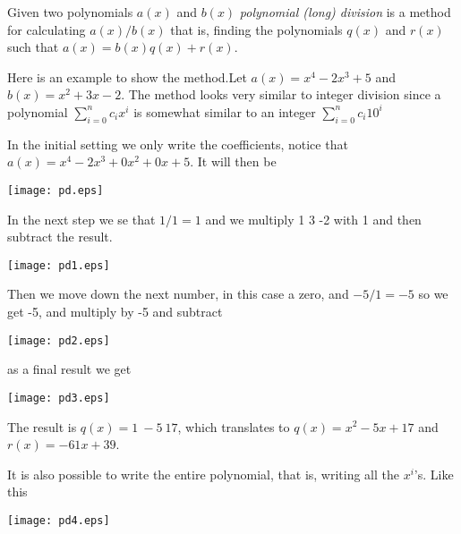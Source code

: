 \documentclass[12pt]{article}
\begin{document}
Given two polynomials $a(x)$ and $b(x)$ \emph{polynomial (long) division} is a method for calculating $a(x)/b(x)$ that is, finding the polynomials $q(x)$ and $r(x)$ such that $a(x)=b(x)q(x)+r(x)$.

Here is an example to show the method.Let $a(x)=x^4-2x^3+5$ and $b(x)=x^2+3x-2$.
The method looks very similar to integer division since a polynomial $\sum_{i=0}^{n} c_ix^i$ is somewhat similar to an integer $\sum_{i=0}^{n} c_i  10^i$

In the initial setting we only write the coefficients, notice that $a(x)=x^4-2x^3+0x^2+0x+5$. It will then be

\texttt{[image: pd.eps]}

In the next step we se that $1/1=1$ and we multiply 1 3 -2 with 1 and then subtract the result. 

\texttt{[image: pd1.eps]}


Then we move down the next number, in this case a zero, and $-5/1=-5$ so we get -5, and multiply by -5 and subtract

\texttt{[image: pd2.eps]}

as a final result we get


\texttt{[image: pd3.eps]}


The result is $q(x)=1\ -5\  17$, which translates to $q(x)=x^2-5x+17$ and $r(x)=-61x+39$.

It is also possible to write the entire polynomial, that is, writing all the $x^i$'s. Like this

\texttt{[image: pd4.eps]}
\end{document}
